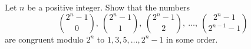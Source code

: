 Let $n$ be a positive integer. Show that the numbers
\[
\binom{2^n-1}{0},\ \binom{2^n-1}{1},\ \binom{2^n-1}{2},\ \ldots,\ \binom{2^n-1}{2^{n-1}-1}
\]
are congruent modulo $2^n$ to $1, 3, 5, \ldots, 2^n - 1$ in some order.

